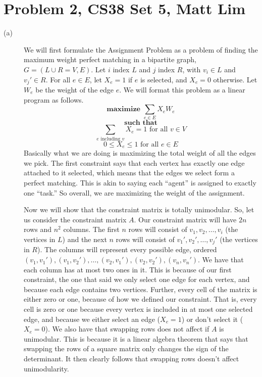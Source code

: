 \documentclass{article}
\begin{document}
\section*{Problem 2, CS38 Set 5, Matt Lim}
\begin{description}
    \item[(a)]
        We will first formulate the Assignment Problem as a problem of finding
        the maximum weight perfect matching in a bipartite graph,
        $G = (L \cup R = V, E)$.  Let $i$ index $L$ and $j$ index $R$, with $v_i
        \in L$ and $v_j' \in R$.
        For all $e \in E$, let $X_e = 1$ if $e$ is selected, and $X_e = 0$
        otherwise. Let $W_e$ be the weight of the edge $e$.
        We will format this problem as a linear program as follows.
        \[ \textbf{maximize } \sum_{e \in E} X_e W_e \]
        \[ \textbf{such that} \]
        \[ \sum_{e \text{ including $v$}} X_e = 1 \text{ for all $v \in V$} \]
        \[ 0 \le X_e \le 1 \text{ for all $e \in E$} \]
        Basically what we are doing is maximizing the total weight of all the
        edges we pick. The first constraint says that each vertex has exactly one
        edge attached to it selected, which means that the edges we select form a perfect
        matching. This is akin to saying each ``agent'' is assigned to exactly one ``task.''
        So overall, we are maximizing the weight of the assignment.

        \vspace{5mm}

        Now we will show that the constraint matrix is totally unimodular. So,
        let us consider the constraint matrix $A$. Our constraint matrix will
        have $2n$ rows and $n^2$ columns. The first $n$ rows will consist of
        $v_1, v_2, \dots, v_i$ (the vertices in $L$) and the next $n$ rows will consist of
        $v_1', v_2', \dots, v_j'$ (the vertices in $R$). The columns will represent
        every possible edge, ordered $(v_1, v_1'), (v_1, v_2'), \dots, (v_2,
        v_1'), (v_2, v_2'), (v_n, v_n')$. We have that each column has
        at most two ones in it. This is because of our first constraint, the one
        that said we only select one edge for each vertex, and because each edge
        contains two vertices. Further, every cell of the matrix is either
        zero or one, because of how we defined our constraint.
        That is, every cell is zero or one because every vertex is included in
        at most one selected edge, and because we either select an edge ($X_e =
        1$) or don't select it ($X_e = 0$). We also have that swapping rows does not affect
        if $A$ is unimodular. This is because it is a linear algebra theorem that says that
        swapping the rows of a square matrix only changes the sign of the
        determinant. It then clearly follows that swapping rows doesn't affect
        unimodularity.


\end{description}
\end{document}
